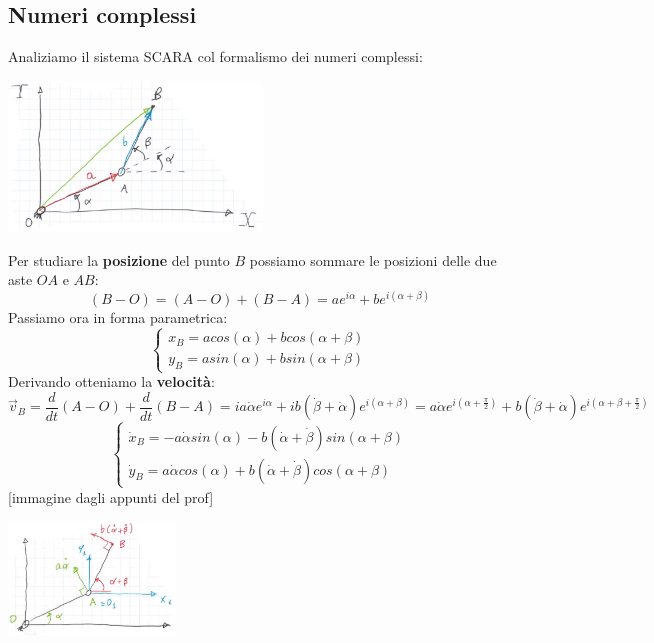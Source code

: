 \subsection{Numeri complessi}
Analiziamo il sistema SCARA col formalismo dei numeri complessi:
\begin{center}
    \includegraphics[height=4cm]{../lezione4/img9.JPG}
\end{center}
Per studiare la \textbf{posizione} del punto $B$ possiamo sommare le posizioni delle due aste $OA$ e $AB$:
\[
    (B-O) = (A-O) + (B-A) = a e^{i \alpha} + b e^{i(\alpha + \beta)}
\]
Passiamo ora in forma parametrica:
\[
    \begin{cases}
        x_B = a cos(\alpha) + b cos(\alpha + \beta)\\
        y_B = a sin(\alpha) + b sin(\alpha + \beta)
    \end{cases}
\]
Derivando otteniamo la \textbf{velocità}:
\[
    \vec{v}_B = \frac{d}{dt} (A-O) + \frac{d}{dt} (B-A) = i a \dot{\alpha} e^{i \alpha} + i b (\dot{\beta} + \dot{\alpha}) e^{i(\alpha+\beta)} = a \dot{\alpha} e^{i(\alpha + \frac{\pi}{2})} + b (\dot{\beta} + \dot{\alpha})e^{i(\alpha + \beta + \frac{\pi}{2})}
\]
\[
    \begin{cases}
        \dot{x}_B = -a \dot{\alpha} sin(\alpha) - b (\dot{\alpha} + \dot{\beta})sin(\alpha + \beta)\\
        \dot{y}_B = a \dot{\alpha} cos(\alpha) + b (\dot{\alpha} + \dot{\beta}) cos(\alpha + \beta)
    \end{cases}
\]
[immagine dagli appunti del prof]
\begin{center}
    \includegraphics[height=3cm]{../lezione4/img10.JPG}
\end{center}
